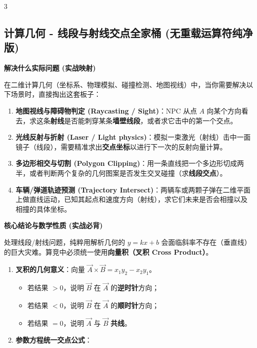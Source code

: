 \documentclass[10pt,landscape,a4paper]{article}
\begin{document}
\begin{multicols*}{3}
\subsection*{计算几何 - 线段与射线交点全家桶 (无重载运算符纯净版)}
\par\addvspace{0.7ex}\noindent\textbf{解决什么实际问题 (实战映射)}\par\nobreak
在二维计算几何（坐标系、物理模拟、碰撞检测、地图视线）中，当你需要解决以下场景时，直接掏出这套板子：\par
\begin{enumerate}[start=1]
\item \textbf{地图视线与障碍物判定 (Raycasting / Sight)}：NPC 从点 $A$ 向某个方向看去，求这条\textbf{射线}是否能刺穿某条\textbf{墙壁线段}，或者求它击中的第一个交点。
\item \textbf{光线反射与折射 (Laser / Light physics)}：模拟一束激光（射线）击中一面镜子（线段），需要精准求出\textbf{交点坐标}以进行下一次的反射向量计算。
\item \textbf{多边形相交与切割 (Polygon Clipping)}：用一条直线把一个多边形切成两半，或者判断两个复杂的几何图案是否发生交叉碰撞（求\textbf{线段交点}）。
\item \textbf{车辆/弹道轨迹预测 (Trajectory Intersect)}：两辆车或两颗子弹在二维平面上做直线运动，已知其起点和速度方向（射线），求它们未来是否会相撞以及相撞的具体坐标。
\end{enumerate}
\par\addvspace{0.7ex}\noindent\textbf{核心结论与数学性质 (实战必背)}\par\nobreak
处理线段/射线问题，纯粹用解析几何的 $y = kx+b$ 会面临斜率不存在（垂直线）的巨大灾难。算竞中必须统一使用\textbf{向量积（叉积 Cross Product）}。\par
\begin{enumerate}[start=1]
\item \textbf{叉积的几何意义}：向量 $\vec{A} \times \vec{B} = x_1y_2 - x_2y_1$。
\begin{itemize}
\item 若结果 $> 0$，说明 $\vec{B}$ 在 $\vec{A}$ 的\textbf{逆时针}方向；
\item 若结果 $< 0$，说明 $\vec{B}$ 在 $\vec{A}$ 的\textbf{顺时针}方向；
\item 若结果 $= 0$，说明 $\vec{A}$ 与 $\vec{B}$ \textbf{共线}。
\end{itemize}
\item \textbf{参数方程统一交点公式}：

\end{enumerate}
\end{multicols*}
\end{document}
